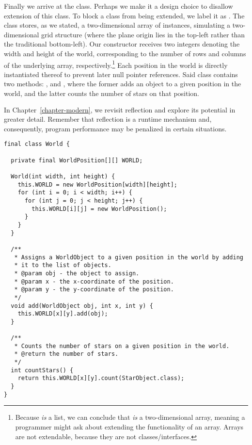 Finally we arrive at the  class. Perhaps we make it a design choice to disallow extension of this class. To block a class from being extended, we label it as . The  class stores, as we stated, a two-dimensional array of  instances, simulating a two-dimensional grid structure (where the plane origin lies in the top-left rather than the traditional bottom-left). Our constructor receives two integers denoting the width and height of the world, corresponding to the number of rows and columns of the underlying array, respectively.\footnote{Because  \emph{is} a list, we can conclude that  \emph{is} a two-dimensional array, meaning a programmer might ask about extending the functionality of an array. Arrays are not extendable, because they are not classes/interfaces.} Each position in the world is directly instantiated thereof to prevent later null pointer references. Said  class contains two methods: , and , where the former adds an object to a given position in the world, and the latter counts the number of stars on that position.

In Chapter~\ref{chapter-modern}, we revisit reflection and explore its potential in greater detail. Remember that reflection is a runtime mechanism and, consequently, program performance may be penalized in certain situations.

\begin{lstlisting}[language=MyJava]
final class World {
  
  private final WorldPosition[][] WORLD;

  World(int width, int height) {
    this.WORLD = new WorldPosition[width][height];
    for (int i = 0; i < width; i++) {
      for (int j = 0; j < height; j++) {
        this.WORLD[i][j] = new WorldPosition();
      }
    }
  }

  /**
   * Assigns a WorldObject to a given position in the world by adding
   * it to the list of objects.
   * @param obj - the object to assign.
   * @param x - the x-coordinate of the position.
   * @param y - the y-coordinate of the position.
   */
  void add(WorldObject obj, int x, int y) {
    this.WORLD[x][y].add(obj);
  }

  /**
   * Counts the number of stars on a given position in the world.
   * @return the number of stars.
   */
  int countStars() {
    return this.WORLD[x][y].count(StarObject.class);
  }
}
\end{lstlisting}
